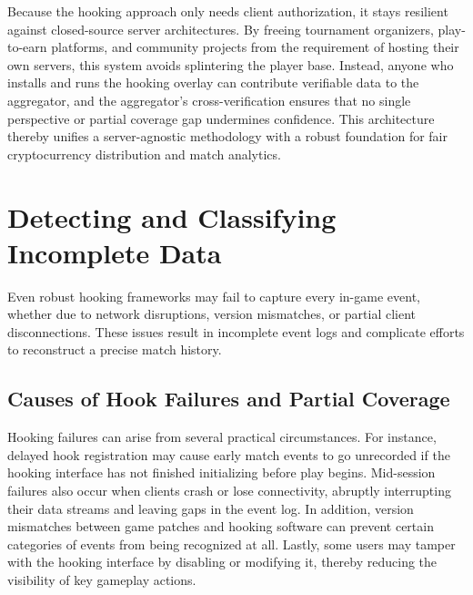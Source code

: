 \documentclass[11pt]{article}
\begin{document}
Because the hooking approach only needs client authorization, it stays resilient against closed-source server architectures. By freeing tournament organizers, play-to-earn platforms, and community projects from the requirement of hosting their own servers, this system avoids splintering the player base. Instead, anyone who installs and runs the hooking overlay can contribute verifiable data to the aggregator, and the aggregator’s cross-verification ensures that no single perspective or partial coverage gap undermines confidence. This architecture thereby unifies a server-agnostic methodology with a robust foundation for fair cryptocurrency distribution and match analytics.

%
%

\section{Detecting and Classifying Incomplete Data}
\label{sec:incompleteData}

Even robust hooking frameworks may fail to capture every in-game event, whether due to
network disruptions, version mismatches, or partial client disconnections. These issues 
result in incomplete event logs and complicate efforts to reconstruct a precise match history.

\subsection{Causes of Hook Failures and Partial Coverage}
Hooking failures can arise from several practical circumstances. For instance, delayed 
hook registration may cause early match events to go unrecorded if the hooking interface 
has not finished initializing before play begins. Mid-session failures also occur when 
clients crash or lose connectivity, abruptly interrupting their data streams and leaving 
gaps in the event log. In addition, version mismatches between game patches and hooking 
software can prevent certain categories of events from being recognized at all. Lastly, 
some users may tamper with the hooking interface by disabling or modifying it, thereby 
reducing the visibility of key gameplay actions.
\end{document}
